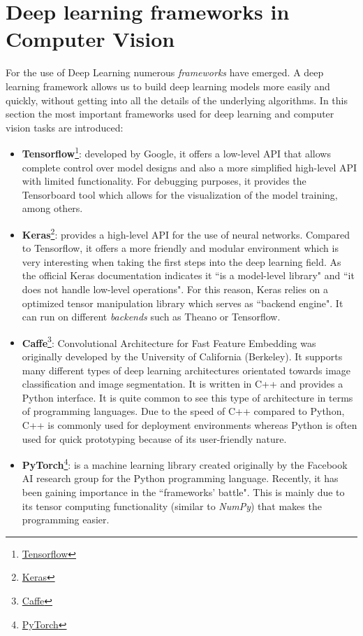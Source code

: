 \section{Deep learning frameworks in Computer Vision}
For the use of Deep Learning numerous \textit{frameworks} have emerged. A deep learning framework allows us to build deep learning models more easily and quickly, without getting into all the details of the underlying algorithms. In this section the most important frameworks used for deep learning and computer vision tasks are introduced:
\begin{itemize}
\item \textbf{Tensorflow}\footnote {\href{https://www.tensorflow.org/}{Tensorflow}}: developed by Google, it offers a low-level API that allows complete control over model designs and also a more simplified high-level API with limited functionality. For debugging purposes, it provides the Tensorboard tool which allows for the visualization of the model training, among others.
\item \textbf{Keras}\footnote {\href{https://keras.io/}{Keras}}: provides a high-level API for the use of neural networks. Compared to Tensorflow, it offers a more friendly and modular environment which is very interesting when taking the first steps into the deep learning field. As the official Keras documentation indicates it ``is a model-level library" and ``it does not handle low-level operations". For this reason, Keras relies on a optimized tensor manipulation library which serves as ``backend engine". It can run on different \textit{backends} such as Theano or Tensorflow.
\item \textbf{Caffe}\footnote {\href{https://caffe.berkeleyvision.org/}{Caffe}}: Convolutional Architecture for Fast Feature Embedding was originally developed by the University of California (Berkeley). It supports many different types of deep learning architectures orientated towards image classification and image segmentation. It is written in C++ and provides a Python interface. It is quite common to see this type of architecture in terms of programming languages. Due to the speed of C++ compared to Python, C++ is commonly used for deployment environments whereas Python is often used for quick prototyping because of its user-friendly nature.
\item \textbf{PyTorch}\footnote {\href{https://pytorch.org/}{PyTorch}}: is a machine learning library created originally by the Facebook AI research group for the Python programming language. Recently, it has been gaining importance in the ``frameworks' battle". This is mainly due to its tensor computing functionality (similar to \textit{NumPy}) that makes the programming easier.
\end{itemize}
